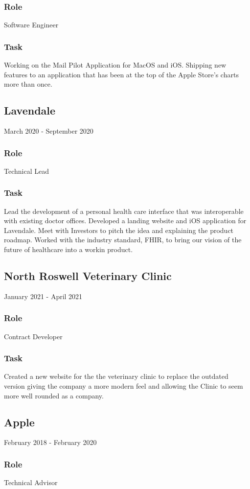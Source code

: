 \documentclass{article}
\begin{document}
\subsubsection{Role}
Software Engineer
\subsubsection{Task}
Working on the Mail Pilot Application for MacOS and iOS. Shipping new features to an application that has been at the top of the Apple Store's charts more than once.
\subsection{Lavendale}
March 2020 - September 2020
\subsubsection{Role}
Technical Lead
\subsubsection{Task}
Lead the development of a personal health care interface that was interoperable with existing doctor offices. Developed a landing website and iOS application for Lavendale. Meet with Investors to pitch the idea and explaining the product roadmap. Worked with the industry standard, FHIR, to bring our vision of the future of healthcare into a workin product.
\subsection{North Roswell Veterinary Clinic}
January 2021 - April 2021
\subsubsection{Role}
Contract Developer
\subsubsection{Task}
Created a new website for the the veterinary clinic to replace the outdated version giving the company a more modern feel and allowing the Clinic to seem more well rounded as a company.
\subsection{Apple}
February 2018 - February 2020
\subsubsection{Role}
Technical Advisor
\end{document}
